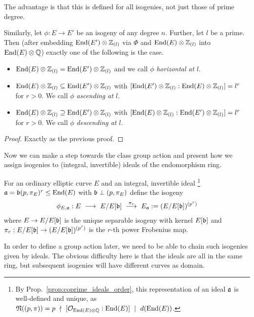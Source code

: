 The advantage is that this is defined for all isogenies, not just those of prime degree.
\begin{prop}
    Similarly, let $\phi: E \to E'$ be an isogeny of any degree $n$.
    Further, let $l$ be a prime.
    Then (after embedding $\mathrm{End}(E') \otimes \mathbb{Z}_{(l)}$ via $\Phi$ and $\mathrm{End}(E) \otimes \mathbb{Z}_{(l)}$ into $\mathrm{End}(E) \otimes \mathbb{Q}$) exactly one of the following is the case.
    \begin{itemize}
        \item $\mathrm{End}(E) \otimes \mathbb{Z}_{(l)} = \mathrm{End}(E') \otimes \mathbb{Z}_{(l)}$ and we call $\phi$ \emph{horizontal at $l$}.
        \item $\mathrm{End}(E) \otimes \mathbb{Z}_{(l)} \subseteq \mathrm{End}(E') \otimes \mathbb{Z}_{(l)}$ with $[\mathrm{End}(E') \otimes \mathbb{Z}_{(l)} : \mathrm{End}(E) \otimes \mathbb{Z}_{(l)}] = l^r$ for $r > 0$. We call $\phi$ \emph{ascending at $l$}.
        \item $\mathrm{End}(E) \otimes \mathbb{Z}_{(l)} \supseteq \mathrm{End}(E') \otimes \mathbb{Z}_{(l)}$ with $[\mathrm{End}(E) \otimes \mathbb{Z}_{(l)} : \mathrm{End}(E') \otimes \mathbb{Z}_{(l)}] = l^r$ for $r > 0$. We call $\phi$ \emph{descending at $l$}.
    \end{itemize}
\end{prop}
\begin{proof}
    Exactly as the previous proof.
\end{proof}
Now we can make a step towards the class group action and present how we assign isogenies to (integral, invertible) ideals of the endomorphism ring.
\begin{definition}
    For an ordinary elliptic curve $E$ and an integral, invertible ideal
    \footnote{By Prop.~\ref{prop:coprime_ideals_order}, this representation of an ideal $\mathfrak{a}$ is well-defined and unique, as $\mathfrak{N}((p, \pi)) = p \ \nmid \  [\mathcal{O}_{\mathrm{End}(E) \otimes \mathbb{Q}} : \mathrm{End}(E)] \ \mid \  d(\mathrm{End}(E))$.}
    $\mathfrak{a} = \mathfrak{b}(p, \pi_E)^r \leq \mathrm{End}(E)$ with $\mathfrak{b} \perp (p, \pi_E)$ define the isogeny
    \begin{equation*}
        \phi_{E, \mathfrak{a}}: E \ \longrightarrow \ E/E[\mathfrak{b}] \ \overset{\pi_r}{\longrightarrow} \ E_{\mathfrak{a}} := (E/E[\mathfrak{b}])^{(p^r)}
    \end{equation*}
    where $E \to E/E[\mathfrak{b}]$ is the unique separable isogeny with kernel $E[\mathfrak{b}]$ and $\pi_r: E/E[\mathfrak{b}] \to (E/E[\mathfrak{b}])^{(p^r)}$ is the $r$-th power Frobenius map.
\end{definition}
In order to define a group action later, we need to be able to chain such isogenies given by ideals.
The obvious difficulty here is that the ideals are all in the same ring, but subsequent isogenies will have different curves as domain.
